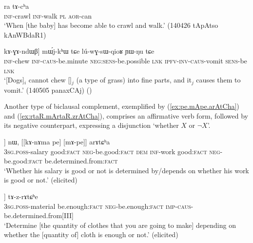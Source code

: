 \begin{exe}
\ex \label{ex:kAnWrtsW.kANke.ra.tAcha}
\gll [kɤ-nɯrtsɯ] [kɤ-ŋke] ra tɤ-cʰa \\
\textsc{inf}-crawl \textsc{inf}-walk \textsc{pl} \textsc{aor}-can \\
\glt `When [the baby] has become able to crawl and walk.' (140426 tApAtso kAnWBdaR1)
\end{exe} 

\begin{exe}
\ex \label{ex:kAndza.kAGAndWB}
\gll [[kɤ-ndza] kɤ-ɣɤ-ndɯβ] mɯ́j-kʰɯ tɕe lú-wɣ-sɯ-qioʁ ɲɯ-ŋu tɕe \\
\textsc{inf}-chew \textsc{inf}-\textsc{caus}-be.minute \textsc{neg}:\textsc{sens}-be.possible \textsc{lnk} \textsc{ipfv}-\textsc{inv}-\textsc{caus}-vomit \textsc{sens}-be \textsc{lnk} \\
\glt `[Dogs]$_i$ cannot chew []$_j$ (a type of grass) into fine parts, and it$_j$ causes them to vomit.' (140505 panaxCAj)
()
\end{exe} 

Another type of biclausal complement, exemplified by (\ref{ex:pe.mApe.arAtCha}) and (\ref{ex:rtaR.mArtaR.zrAtCha}), comprises an affirmative verb form, followed by its negative counterpart, expressing a disjunction `whether $X$ or $\lnot X$'.

\begin{exe} 
\ex \label{ex:pe.mApe.arAtCha}
\gll  [[ɯ-ngra pe] [mɤ-pe]] nɯ, [[kɤ-nɤma pe] [mɤ-pe]] arɤtɕʰa \\
\textsc{3sg}.\textsc{poss}-salary good:\textsc{fact} \textsc{neg}-be.good:\textsc{fact} \textsc{dem} \textsc{inf}-work good:\textsc{fact} \textsc{neg}-be.good:\textsc{fact} be.determined.from:\textsc{fact} \\
\glt `Whether his salary is good or not is determined by/depends on whether his work is good or not.' (elicited)
\end{exe} 

\begin{exe} 
\ex \label{ex:rtaR.mArtaR.zrAtCha}
\gll  [[ɯ-spa rtaʁ] [mɤ-rtaʁ]] tɤ-z-rɤtɕʰe \\
\textsc{3sg}.\textsc{poss}-material be.enough:\textsc{fact} \textsc{neg}-be.enough:\textsc{fact} \textsc{imp}-\textsc{caus}-be.determined.from[III] \\
\glt `Determine [the quantity of clothes that you are going to make] depending on whether the [quantity of] cloth is enough or not.' (elicited)
\end{exe}


